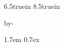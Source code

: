 

\topmargin 0pt
\textwidth 6.5truein
\textheight 8.5truein
\oddsidemargin 0pt
\evensidemargin 0pt

\advance\voffset by-\headheight


\parindent 1.7em
\parskip 0.7ex

\def\lestrut{\vrule height1.6ex depth.45ex width0pt}

%

\newcommand{\SAO}{{\em SAOimage}}
\newcommand{\IRAF}{{\rm IRAF}}			%
\newcommand{\PROS}{{\rm PROS}}			%
\newcommand{\menu}[1]{{\sf#1}}			%
\newcommand{\key}[1]{{\tt#1}}			%

\newcommand{\argitem}[1]{\item[]\shortstack[l]{#1}} %
\newcommand{\argname}[1]{{\tt#1}}		%
\newcommand{\task}[1]{{\it#1\/}}		%
\let\uppercase=\relax				%

\pagestyle{headings}		%


